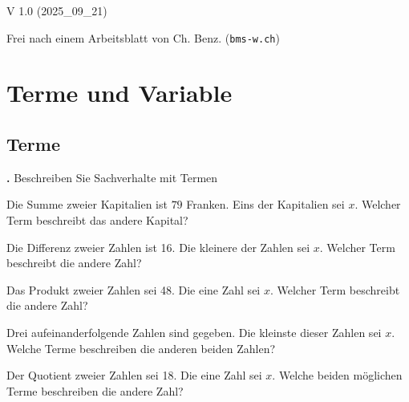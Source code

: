 
\renewcommand{\bbwAufgabenBlockID}{Gl1LinTxt}

\renewcommand{\metaHeaderLine}{Textaufgaben}
\renewcommand{\arbeitsblattTitel}{Textaufgaben zu linearen Gleichungen}


\arbeitsblattHeader{}

\begin{center}V 1.0 (2025\_09\_21) \end{center}

{\tiny{Frei nach einem Arbeitsblatt von Ch. Benz. (\texttt{bms-w.ch})}}

\section{Terme und Variable}


\subsection{Terme}

\textbf{\bbwAufgabenNummer{}.}
Beschreiben Sie Sachverhalte mit Termen

\begin{bbwAufgabenBlock}
\item Die Summe zweier Kapitalien ist $79$ Franken. Eins der
Kapitalien sei $x$. Welcher Term
beschreibt das andere Kapital?


\item Die Differenz zweier Zahlen ist 16. Die kleinere der Zahlen sei
$x$. Welcher Term beschreibt die andere Zahl?



\item Das Produkt zweier Zahlen sei 48. Die eine Zahl sei $x$. Welcher
Term beschreibt die andere Zahl?


\item Drei aufeinanderfolgende Zahlen sind gegeben. Die kleinste
dieser Zahlen sei $x$. Welche Terme beschreiben die anderen beiden
Zahlen?


\item Der Quotient zweier Zahlen sei 18. Die eine Zahl sei $x$. Welche
beiden möglichen Terme beschreiben die andere Zahl?


\end{bbwAufgabenBlock}

